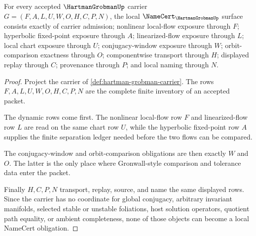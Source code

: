 \begin{theorem}
\label{thm:hartman-grobman-namecert-obligations}
For every accepted $\HartmanGrobmanUp$ carrier $G=(F,A,L,U,W,O,H,C,P,N)$, the local $\NameCert_{\HartmanGrobmanUp}$ surface consists exactly of carrier admission; nonlinear local-flow exposure through $F$; hyperbolic fixed-point exposure through $A$; linearized-flow exposure through $L$; local chart exposure through $U$; conjugacy-window exposure through $W$; orbit-comparison exactness through $O$; componentwise transport through $H$; displayed replay through $C$; provenance through $P$; and local naming through $N$.
\end{theorem}
\begin{proof}
Project the carrier of \autoref{def:hartman-grobman-carrier}. The rows $F,A,L,U,W,O,H,C,P,N$ are the complete finite inventory of an accepted packet.

The dynamic rows come first. The nonlinear local-flow row $F$ and linearized-flow row $L$ are read on the same chart row $U$, while the hyperbolic fixed-point row $A$ supplies the finite separation ledger needed before the two flows can be compared.

The conjugacy-window and orbit-comparison obligations are then exactly $W$ and $O$. The latter is the only place where Gronwall-style comparison and tolerance data enter the packet.

Finally $H,C,P,N$ transport, replay, source, and name the same displayed rows. Since the carrier has no coordinate for global conjugacy, arbitrary invariant manifolds, selected stable or unstable foliations, host solution operators, quotient path equality, or ambient completeness, none of those objects can become a local NameCert obligation.
\end{proof}

